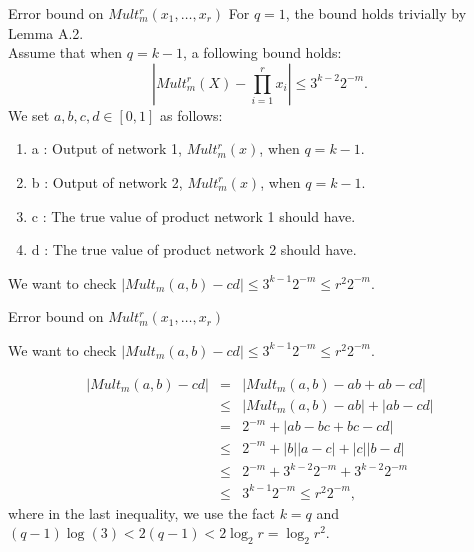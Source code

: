 \documentclass{if-beamer}
\newcommand\STAR{\raisebox{-.7em}{\tikz{\node[draw,star,star point height=.7em,minimum size=1em]{};} }}
\begin{document}
\begin{frame}{Error bound on $Mult_{m}^{r}(x_{1},\dots,x_{r})$}
 For $q=1$, the bound holds trivially by Lemma A.2. \\
 Assume that when $q=k-1$, a following bound holds: 
    \begin{equation*}
        \left| Mult_m^{r}(X) - \prod_{i=1}^{r}x_{i} \right| \leq 3^{k-2}2^{-m}.
    \end{equation*}
 We set $a,b,c,d \in [0,1]$ as follows:
 \begin{enumerate}
     \item a : Output of network 1, $Mult_m^{r}(x)$, when $q=k-1$.
     \item b : Output of network 2, $Mult_m^{r}(x)$, when $q=k-1$.
     \item c : The true value of product network 1 should have.
     \item d : The true value of product network 2 should have.
 \end{enumerate}   
 
 \STAR We want to check $\left| Mult_{m}(a,b) - cd \right|\leq 3^{k-1}2^{-m}\leq r^{2}2^{-m}$.
 
\end{frame}


\begin{frame}{Error bound on $Mult_{m}^{r}(x_{1},\dots,x_{r})$}

\STAR We want to check $\left| Mult_{m}(a,b) - cd \right|\leq 3^{k-1}2^{-m}\leq r^{2}2^{-m}$.

\begin{eqnarray*}
    \left| Mult_{m}(a,b) - cd \right| &=& 
    \left| Mult_{m}(a,b) - ab + ab - cd \right| \\
    &\leq& \left| Mult_{m}(a,b) - ab \right| +\left| ab - cd \right| \\
    &=& 2^{-m} + \left| ab-bc+bc-cd \right| \\
    &\leq& 2^{-m} + \left| b \right| \left| a-c \right| + \left| c \right| \left|b-d \right|\\
    &\leq& 2^{-m} + 3^{k-2}2^{-m} + 3^{k-2}2^{-m}\\
    &\leq& 3^{k-1}2^{-m} \leq r^{2}2^{-m},
\end{eqnarray*}
where in the last inequality, we use the fact
$k=q$ and $(q-1)\log(3)<2(q-1)<2\log_{2}r=\log_{2}r^{2}$.

\end{frame}
\end{document}
